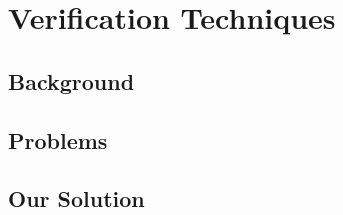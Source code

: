 \chapter{\;\;\;\;Verification Techniques}
\label{sec:overview-verification}

\section{Background}
\label{sec:overview-verification:background}

\section{Problems}
\label{sec:overview-verification:problems}
%
%
%


\section{Our Solution}
\label{sec:overview-verification:solution}

%






